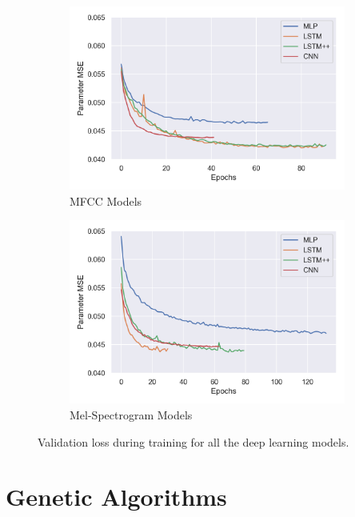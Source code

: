 \begin{figure}[ht]
    \centering
    \begin{subfigure}[b]{0.49\textwidth}
        \centering
        \includegraphics[width=\textwidth]{figures/inverse-synth/mfcc-model-loss.png }
        \caption{MFCC Models}
    \end{subfigure}
    \begin{subfigure}[b]{0.49\textwidth}
        \centering
        \includegraphics[width=\textwidth]{figures/inverse-synth/mel-model-loss.png}
        \caption{Mel-Spectrogram Models}
    \end{subfigure}
    \caption{Validation loss during training for all the deep learning models.}
    \label{fig:training-loss}
\end{figure}

\section{Genetic Algorithms}
\label{inverse-synth:ga}

